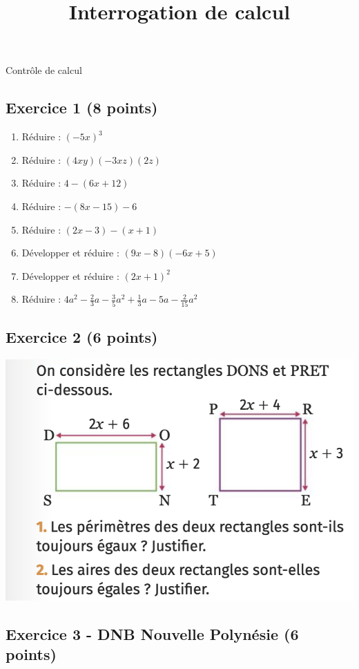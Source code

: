 \documentclass[12 pt]{extarticle}
\title{Interrogation de calcul}
\date{}
\theoremstyle{plain}
\begin{document}
\begin{center}{\Large Contrôle de calcul}\\
 \end{center} 
 \subsection*{Exercice 1 (8 points)}
   \begin{enumerate}
   \item Réduire : $(-5x)^3$
   \item Réduire : $(4xy)(-3xz)(2z)$
   \item Réduire : $4-(6x+12)$
   \item Réduire : $-(8x-15)-6$
   \item Réduire : $(2x-3)-(x+1)$
   \item Développer et réduire : $(9x-8)(-6x+5)$
   \item Développer et réduire : $(2x+1)^2$
   \item Réduire : $4a^2-\frac23a - \frac35a^2+\frac13a-5a-\frac2{15}a^2$ \end{enumerate}


 \subsection*{Exercice 2 (6 points)}  
 \includegraphics[scale=.65]{Exo2}
 \subsection*{Exercice 3 - DNB Nouvelle Polynésie  (6 points)}
\end{document}
